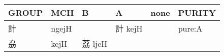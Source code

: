 \documentclass[14pt,a4paper]{scrartcl}
\begin{document}
\begin{longtable}[c]{@{}llllll@{}}
\toprule
\begin{minipage}[b]{0.14\columnwidth}\raggedright\strut
GROUP
\strut\end{minipage} &
\begin{minipage}[b]{0.14\columnwidth}\raggedright\strut
MCH
\strut\end{minipage} &
\begin{minipage}[b]{0.14\columnwidth}\raggedright\strut
B
\strut\end{minipage} &
\begin{minipage}[b]{0.14\columnwidth}\raggedright\strut
A
\strut\end{minipage} &
\begin{minipage}[b]{0.14\columnwidth}\raggedright\strut
none
\strut\end{minipage} &
\begin{minipage}[b]{0.14\columnwidth}\raggedright\strut
PURITY
\strut\end{minipage}\tabularnewline
\midrule
\endhead
\begin{minipage}[t]{0.14\columnwidth}\raggedright\strut
計
\strut\end{minipage} &
\begin{minipage}[t]{0.14\columnwidth}\raggedright\strut
ngejH
\strut\end{minipage} &
\begin{minipage}[t]{0.14\columnwidth}\raggedright\strut
\strut\end{minipage} &
\begin{minipage}[t]{0.14\columnwidth}\raggedright\strut
計 kejH
\strut\end{minipage} &
\begin{minipage}[t]{0.14\columnwidth}\raggedright\strut
\strut\end{minipage} &
\begin{minipage}[t]{0.14\columnwidth}\raggedright\strut
pure:A
\strut\end{minipage}\tabularnewline
\begin{minipage}[t]{0.14\columnwidth}\raggedright\strut
劦
\strut\end{minipage} &
\begin{minipage}[t]{0.14\columnwidth}\raggedright\strut
kejH
\strut\end{minipage} &
\begin{minipage}[t]{0.14\columnwidth}\raggedright\strut
荔 ljeH
\strut\end{minipage} &
\begin{minipage}[t]{0.14\columnwidth}\raggedright\strut

\end{minipage}
\end{longtable}
\end{document}
